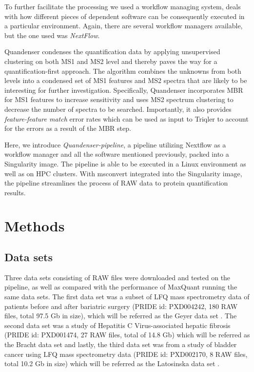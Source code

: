 \documentclass[11pt]{article}
\begin{document}
To further facilitate the processing we used a workflow managing system, deals with how different pieces of dependent software can be consequently executed in a particular environment. Again, there are several workflow managers available, but the one used was \textit{NextFlow}\cite{di2017nextflow}.

Quandenser condenses the quantification data by applying unsupervised clustering on both MS1 and MS2 level and thereby paves the way for a quantification-first approach. The algorithm combines the unknowns from both levels into a condensed set of MS1 features and MS2 spectra that are likely to be interesting for further investigation. Specifically, Quandenser incorporates MBR for MS1 features to increase sensitivity and uses MS2 spectrum clustering to decrease the number of spectra to be searched. Importantly, it also provides {\em feature-feature match} error rates which can be used as input to Triqler to account for the errors as a result of the MBR step.

Here, we introduce \textit{Quandenser-pipeline}, a pipeline utilizing Nextflow as a workflow manager and all the software mentioned previously, packed into a Singularity image. The pipeline is able to be executed in a Linux environment as well as on HPC clusters. With msconvert integrated into the Singularity image, the pipeline streamlines the process of RAW data to protein quantification results.

\section*{Methods}

\subsection*{Data sets}
Three data sets consisting of RAW files were downloaded and tested on the pipeline, as well as compared with the performance of MaxQuant running the same data sets. The first data set was a subset of LFQ mass spectrometry data of patients before and after bariatric surgery (PRIDE id: PXD004242, 180 RAW files, total 97.5 Gb in size), which will be referred as the Geyer data set \cite{geyer2016bartric}. The second data set was a study of Hepatitis C Virus-associated hepatic fibrosis (PRIDE id: PXD001474, 27 RAW files, total of 14.8 Gb) which will be referred as the Bracht data set and lastly, the third data set was from a study of bladder cancer using LFQ mass spectrometry data (PRIDE id: PXD002170, 8 RAW files, total 10.2 Gb in size) which will be referred as the Latosinska data set \cite{bracht2015analysis} \cite{latosinska2015comparative}.
\end{document}
